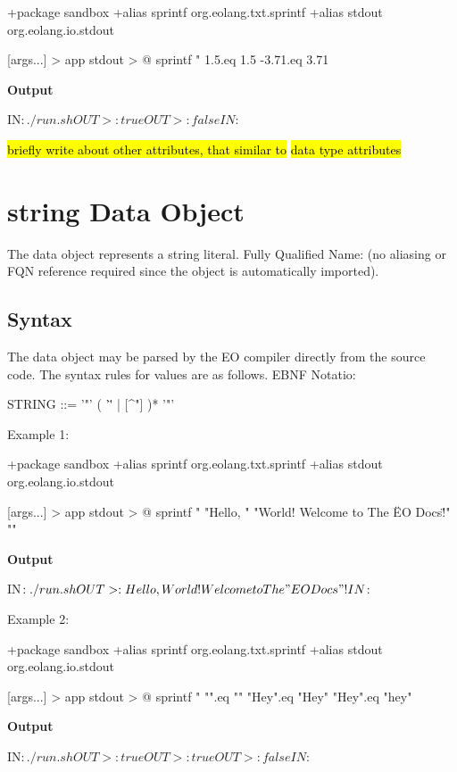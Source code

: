 \documentclass[12pt]{book}
\begin{document}
{\begin{ffcode}
+package sandbox
+alias sprintf org.eolang.txt.sprintf
+alias stdout org.eolang.io.stdout

[args...] > app
  stdout > @
    sprintf
      "%
      1.5.eq 1.5
      -3.71.eq 3.71
\end{ffcode}
\textbf{Output}
\begin{ffcode}
IN$: ./run.sh
OUT>: true
OUT>: false
IN$:
\end{ffcode}

\hl{briefly write about other attributes, that similar to}  \hl{data type attributes}

\section{string Data Object} \label{seciotn:string}
The  data object represents a string literal.
Fully Qualified Name:  (no aliasing or FQN reference required since the object is automatically imported).

\subsection{Syntax}
The  data object may be parsed by the EO compiler directly from the source code. The syntax rules for values are as follows. EBNF Notatio:
\begin{ffcode}

STRING   ::= '"' ( '\"' | [^"] )* '"'
\end{ffcode}
Example 1:
\begin{ffcode}
+package sandbox
+alias sprintf org.eolang.txt.sprintf
+alias stdout org.eolang.io.stdout

[args...] > app
  stdout > @
    sprintf
      "%
      "Hello, "
      "World! Welcome to The \"EO Docs\"!"
      "\n"
\end{ffcode}
\textbf{Output}
\begin{ffcode}
IN$: ./run.sh
OUT>: Hello, World! Welcome to The "EO Docs"!
IN$:
\end{ffcode}
Example 2:
\begin{ffcode}
+package sandbox
+alias sprintf org.eolang.txt.sprintf
+alias stdout org.eolang.io.stdout

[args...] > app
  stdout > @
    sprintf
      "%
      "".eq ""
      "Hey".eq "Hey"
      "Hey".eq "hey"
\end{ffcode}
\textbf{Output}
\begin{ffcode}
IN$: ./run.sh
OUT>: true
OUT>: true
OUT>: false
IN$:
\end{ffcode}

}
\end{document}
